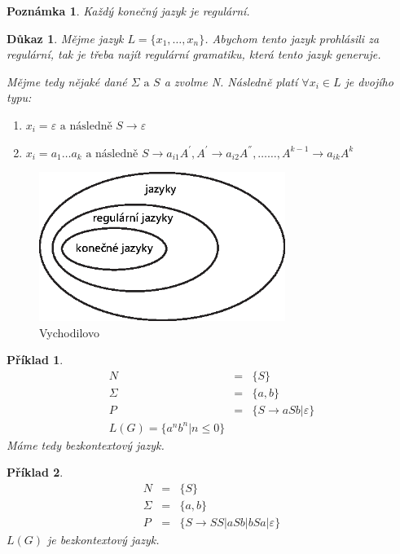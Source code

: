 \documentclass[10pt, a4paper, titlepage]{article}
\theoremstyle{note}
\newtheorem{dukaz}{\textbf{Důkaz}}
\newtheorem{priklad}{\textbf{Příklad}}
\newtheorem{poznamka}{\textbf{Poznámka}}
\begin{document}
\begin{poznamka}
Každý konečný jazyk je regulární.
\end{poznamka}

\begin{dukaz}
Mějme jazyk $L = \lbrace x_{1},\ldots, x_{n} \rbrace$. Abychom tento jazyk prohlásili za regulární, tak je třeba najít regulární gramatiku,
která tento jazyk generuje.

Mějme tedy nějaké dané $\Sigma \text{ a } S$ a zvolme \emph{N}. Následně platí $\forall x_{i} \in L$ je dvojího typu:

\begin{enumerate}
\item
$x_{i} = \varepsilon \text{ a následně } S \rightarrow \varepsilon$

\item
$x_{i} = a_{1}\ldots a_{k} \text{ a následně } S \rightarrow a_{i1}A^{'}, A^{'} \rightarrow a_{i2}A^{''},\ldots\ldots, A^{k-1} \rightarrow a_{ik}A^{k}$
\end{enumerate}
\vspace{0px}
\end{dukaz}

\begin{figure}[ht]
\centering\includegraphics[width=8cm]{vajicko-1.eps}
\caption{Vychodilovo }\label{obr-2}
\end{figure}

\begin{priklad}
\begin{eqnarray*}
N &=& \lbrace S \rbrace \\
\Sigma &=& \lbrace a, b \rbrace \\
P &=& \lbrace S \rightarrow aSb | \varepsilon \rbrace \\
L(G) = \lbrace a^{n}b^{n} | n \leq 0 \rbrace
\end{eqnarray*}
Máme tedy \emph{bezkontextový} jazyk.
\end{priklad}

\begin{priklad}
\begin{eqnarray*}
N &=& \lbrace S \rbrace \\
\Sigma &=& \lbrace a, b \rbrace \\
P &=& \lbrace S \rightarrow SS|aSb|bSa| \varepsilon \rbrace
\end{eqnarray*}
$L(G)$ je \emph{bezkontextový} jazyk.
\end{priklad}
\end{document}
